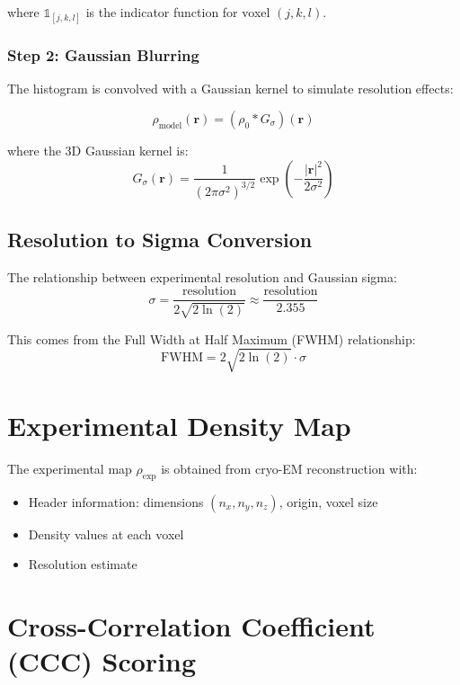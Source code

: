 \documentclass[12pt,a4paper]{article}
\begin{document}
where $\mathbb{1}_{[j,k,l]}$ is the indicator function for voxel $(j,k,l)$.

\subsubsection{Step 2: Gaussian Blurring}
The histogram is convolved with a Gaussian kernel to simulate resolution effects:

\begin{equation}
\rho_{\text{model}}(\mathbf{r}) = (\rho_0 * G_\sigma)(\mathbf{r})
\end{equation}

where the 3D Gaussian kernel is:
\begin{equation}
G_\sigma(\mathbf{r}) = \frac{1}{(2\pi\sigma^2)^{3/2}} \exp\left(-\frac{|\mathbf{r}|^2}{2\sigma^2}\right)
\end{equation}

\subsection{Resolution to Sigma Conversion}
The relationship between experimental resolution and Gaussian sigma:
\begin{equation}
\sigma = \frac{\text{resolution}}{2\sqrt{2\ln(2)}} \approx \frac{\text{resolution}}{2.355}
\end{equation}

This comes from the Full Width at Half Maximum (FWHM) relationship:
\begin{equation}
\text{FWHM} = 2\sqrt{2\ln(2)} \cdot \sigma
\end{equation}

\section{Experimental Density Map}
The experimental map $\rho_{\text{exp}}$ is obtained from cryo-EM reconstruction with:
\begin{itemize}
    \item Header information: dimensions $(n_x, n_y, n_z)$, origin, voxel size
    \item Density values at each voxel
    \item Resolution estimate
\end{itemize}

\section{Cross-Correlation Coefficient (CCC) Scoring}
\end{document}

